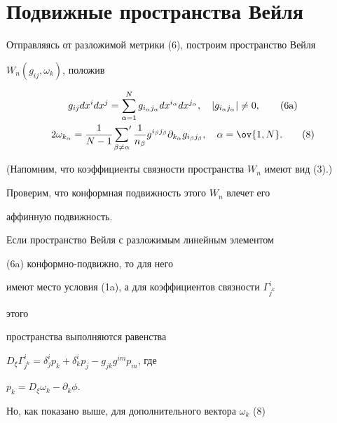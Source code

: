  


\section{Подвижные пространства Вейля} 


 


Отправляясь от разложимой метрики (6), построим пространство Вейля 


$W_n(g_{ij},\omega_k)$, положив 


\begin{gather} 


g_{ij}dx^i dx^j=\sum^N_{\alpha=1} 


g_{i_\alpha j_\alpha}dx^{i_\alpha}dx^{j_\alpha},\quad 


|g_{i_\alpha j_\alpha}|\ne0,\tag{6a}\\ 


% 


2\omega_{k_\alpha}=\frac{1}{N-1}\sideset{}{'} 


\sum_{\beta\ne\alpha}\frac{1}{n_\beta} 


g^{i_\beta j_\beta}\partial_{k_\alpha} 


g_{i_\beta j_\beta},\quad \alpha=\ov{1,N}.\tag{8} 


\end{gather} 


(Напомним, что коэффициенты связности пространства $W_n$ имеют вид (3).) 


\addtocounter{equation}{1}


 


Проверим, что конформная подвижность этого $W_n$ влечет его 


аффинную подвижность. 


Если пространство Вейля с разложимым линейным элементом


(6a) конформно-подвижно, то для него 


имеют место условия (1a), а для коэффициентов связности $\Gamma^i_{j^k}$ 


этого 


пространства выполняются равенства 


$D_\xi\Gamma^i_{j^k}=\delta^i_j p_k+ 


\delta^i_k p_j-g_{jk}g^{im}p_m$, где 


$p_k=D_\xi\omega_k-\partial_k\phi$. 


Но, как показано выше, для дополнительного вектора $\omega_k$ (8) 



